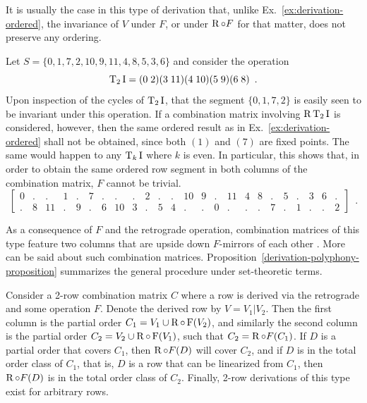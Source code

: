 It is usually the case in this type of derivation that, unlike Ex.~\ref{ex:derivation-ordered}, the invariance of $V$ under $F$, or under $\operatorname{R} \circ F$ for that matter, does not preserve any ordering.

\begin{example}
    \cite[212]{Starr1984}
    Let $S = \{ 0, 1, 7, 2, 10, 9, 11, 4, 8, 5, 3, 6 \}$ and consider the operation
    \begin{equation}
        \operatorname{T}_2\operatorname{I} = (0 \; 2) (3 \; 11) (4 \; 10) (5 \; 9) (6 \; 8) \enspace.
    \end{equation}
    Upon inspection of the cycles of $\operatorname{T}_2\operatorname{I}$, that the segment $\{ 0, 1, 7, 2 \}$ is easily seen to be invariant under this operation. If a combination matrix involving $\operatorname{R}\operatorname{T}_2\operatorname{I}$ is considered, however, then the same ordered result as in Ex.~\ref{ex:derivation-ordered} shall not be obtained, since both $(1)$ and $(7)$ are fixed points. The same would happen to any $\operatorname{T}_k\operatorname{I}$ where $k$ is even. In particular, this shows that, in order to obtain the same ordered row segment in both columns of the combination matrix, $F$ cannot be trivial.
	\begin{equation}
    	\left[
    	\begin{array}{cccccccccccc|cccccccccccc}
        	0 & . & . & 1 & . & 7 & . & . & . & 2 & . & . & 10 & 9 & . & 11 & 4 & 8 & . & 5 & . & 3 & 6 & . \\
        	. & 8 & 11 & . & 9 & . & 6 & 10 & 3 & . & 5 & 4 & . & . & 0 & . & . & . & 7 & . & 1 & . & . & 2
    	\end{array}
    	\right] \enspace.
	\end{equation}
\end{example}

As a consequence of $F$ and the retrograde operation, combination matrices of this type feature two columns that are upside down $F$-mirrors of each other \cite[211]{Starr1984}. More can be said about such combination matrices. Proposition~\ref{derivation-polyphony-proposition} summarizes the general procedure under set-theoretic terms.

\begin{proposition}
	\label{derivation-polyphony-proposition}
    \cite[211, 214]{Starr1984}
    Consider a 2-row combination matrix $C$ where a row is derived via the retrograde and some operation $F$. Denote the derived row by $V = V_1 | V_2$. Then the first column is the partial order $C_1 = V_1 \cup \operatorname{R} \circ \operatorname{F}(V_2)$, and similarly the second column is the partial order $C_2 = V_2 \cup \operatorname{R} \circ \operatorname{F}(V_1)$, such that $C_2 = \operatorname{R} \circ F(C_1)$. If $D$ is a partial order that covers $C_1$, then $\operatorname{R} \circ F(D)$ will cover $C_2$, and if $D$ is in the total order class of $C_1$, that is, $D$ is a row that can be linearized from $C_1$, then $\operatorname{R} \circ F(D)$ is in the total order class of $C_2$. Finally, 2-row derivations of this type exist for arbitrary rows.
\end{proposition}

